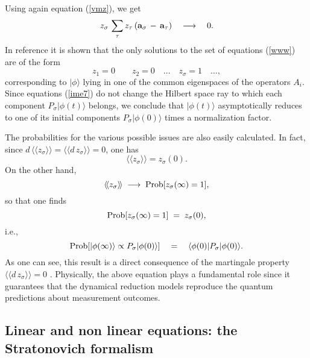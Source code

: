 \documentclass[12pt]{article}
\newcommand{\llangle}{\langle\!\langle}
\newcommand{\rrangle}{\rangle\!\rangle}
\begin{document}
Using again equation (\ref{vmz}), we get
\begin{equation} \label{soe}
z_{\sigma}\, \sum_{\tau} z_{\tau}\, ({\bf a}_{\sigma} \, - \, {\bf
a}_{\tau}) \quad \longrightarrow \quad 0.
\end{equation}
In reference \cite{csl} it is shown that the only solutions to the
set of equations (\ref{www}) are of the form
\[
z_{1} = 0 \qquad z_{2} = 0 \quad \ldots \quad z_{\sigma} = 1 \quad
\ldots,
\]
corresponding to $|\phi\rangle$ lying in one of the common
eigenspaces of the operators $A_{i}$.  Since equations
(\ref{ime7}) do not change  the Hilbert space ray to which each
component $P_{\sigma}|\phi(t)\rangle$ belongs, we conclude that
$|\phi(t)\rangle$ asymptotically reduces to one of its initial
components $P_{\sigma}|\phi(0)\rangle$ times a normalization
factor.

The probabilities for the various possible issues are also easily
calculated. In fact, since $d\, \llangle z_{\sigma} \rrangle  =
\llangle d\, z_{\sigma} \rrangle = 0$, one has
\begin{equation}
\llangle z_{\sigma} \rrangle = z_{\sigma}(0).
\end{equation}
On the other hand,
\begin{equation}
\llangle z_{\sigma} \rrangle \; \longrightarrow \;
\makebox{Prob}[z_{\sigma}(\infty) = 1],
\end{equation}
so that one finds
\begin{equation}
{\makebox{Prob}}[z_{\sigma}(\infty) = 1] \; = \; z_{\sigma}(0),
\end{equation}
i.e.,
\begin{equation} \label{ixfgjb}
\makebox{Prob}[|\phi(\infty)\rangle \propto
P_{\sigma}|\phi(0)\rangle] \quad = \quad \langle\phi(0)|P_{\sigma}
|\phi(0)\rangle.
\end{equation}
As one can see, this result is a direct consequence of the
martingale property $\llangle d\, z_{\sigma} \rrangle  = 0$
\cite{pea3,pea4,csl0}. Physically, the above equation plays a
fundamental role since it guarantees that the dynamical reduction
models reproduce the quantum predictions about measurement
outcomes.


\subsection{Linear and non linear equations: the Stratonovich
formalism} \label{sec64}
\end{document}
